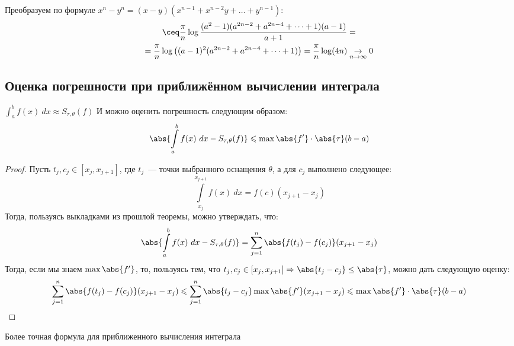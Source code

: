 \begin{example}
\begin{enumerate}
\begin{itemize}
\[            \] 
            Преобразуем по формуле $x^n - y^n = (x - y)(x^{n - 1} + x^{n - 2}y + \dots + y^{n - 1})$:
            \[
                \begin{gathered}
                    \ceq \frac{\pi}{n}\log\frac{(a^2-1)(a^{2n - 2}+a^{2n - 4} + \dots + 1)(a-1)}{a+1}=\\=
                    \frac{\pi}{n}\log\left((a-1)^2(a^{2n - 2}+a^{2n - 4} + \dots + 1)\right) = \frac{\pi}{n}\log(4n)
                    \underset{n\to\infty}{\to} 0
                \end{gathered}
            \] 
    \end{itemize}
    \end{enumerate}
    
\end{example}


\subsection{Оценка погрешности при приближённом вычислении интеграла}
\begin{remark}
    $\int_a^b f(x)\ dx \approx S_{\tau, \theta}(f)$
    И можно оценить погрешность следующим образом:
     \[
        \abs{\int\limits_{a}^{b}{f(x)\ dx} - S_{\tau, \theta}(f)} \leqslant \max{\abs{f'}} \cdot \abs{\tau} (b - a) 
    \] 
\end{remark}
\begin{proof}
    Пусть $t_j, c_j \in [x_j, x_{j + 1}]$, где $t_j$~--- точки выбранного оснащения $\theta$, а для $c_j$ выполнено следующее:
    \[
        \int\limits_{x_j}^{x_{j + 1}}{f(x)\ dx} = f(c) (x_{j + 1} - x_j)
    \]
    Тогда, пользуясь выкладками из прошлой теоремы, можно утверждать, что:
     \[
        \abs{\int\limits_{a}^{b}{f(x)\ dx} - S_{\tau, \theta}(f)} =
        \sum\limits_{j = 1}^{n} \abs{f(t_j) - f(c_j)}(x_{j + 1} - x_j) 
    \] 
    Тогда, если мы знаем $\max{\abs{f'}}$, то, пользуясь тем, что $t_j, c_j \in [x_j, x_{j + 1}] \Rightarrow \abs{t_j - c_j} \le \abs{\tau}$,
    можно дать следующую оценку:
    \[
        \begin{gathered}
            \sum\limits_{j = 1}^{n} \abs{f(t_j) - f(c_j)}(x_{j + 1} - x_j) \leqslant 
            \sum\limits_{j = 1}^{n} \abs{t_j - c_j} \max{\abs{f'}}(x_{j + 1} - x_j) \leqslant 
            \max{\abs{f'}} \cdot \abs{\tau} (b - a) 
        \end{gathered}
    \]
\end{proof} 
\quad 

\begin{remark}
    Более точная формула для приближенного вычисления интеграла
\end{remark}


